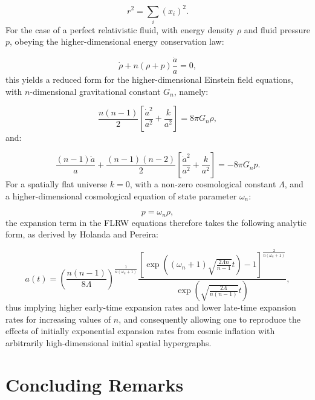 \documentclass{article}
\begin{document}
\begin{equation}
r^2 = \sum_{i} \left( x_i \right)^2.
\end{equation}
For the case of a perfect relativistic fluid, with energy density ${\rho}$ and fluid pressure $p$, obeying the higher-dimensional energy conservation law:

\begin{equation}
\dot{\rho} + n \left( \rho + p \right) \frac{\dot{a}}{a} = 0,
\end{equation}
this yields a reduced form for the higher-dimensional Einstein field equations, with $n$-dimensional gravitational constant ${G_n}$, namely:

\begin{equation}
\frac{n (n - 1)}{2} \left[ \frac{\dot{a}^2}{a^2} + \frac{k}{a^2} \right] = 8 \pi G_n \rho,
\end{equation}
and:

\begin{equation}
\frac{(n - 1) \ddot{a}}{a} + \frac{(n - 1) (n - 2)}{2} \left[ \frac{\dot{a}^2}{a^2} + \frac{k}{a^2} \right] = - 8 \pi G_n p.
\end{equation}
For a spatially flat universe ${k = 0}$, with a non-zero cosmological constant ${\Lambda}$, and a higher-dimensional cosmological equation of state parameter ${\omega_n}$\cite{turner}:

\begin{equation}
p = \omega_n \rho,
\end{equation}
the expansion term in the FLRW equations therefore takes the following analytic form, as derived by Holanda and Pereira\cite{holanda}:

\begin{equation}
a(t) = \left( \frac{n (n - 1)}{8 \Lambda} \right)^{\frac{1}{n \left( \omega_n + 1 \right)}} \frac{\left[ \exp \left( \left( \omega_n + 1 \right) \sqrt{\frac{2 \Lambda n}{n - 1}} t \right) - 1 \right]^{\frac{2}{n \left( \omega_n + 1 \right)}}}{\exp \left( \sqrt{\frac{2 \Lambda}{n (n - 1)}} t \right)},
\end{equation}
thus implying higher early-time expansion rates and lower late-time expansion rates for increasing values of $n$, and consequently allowing one to reproduce the effects of initially exponential expansion rates from cosmic inflation with arbitrarily high-dimensional initial spatial hypergraphs.


\section{Concluding Remarks}
\end{document}
